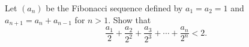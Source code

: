 Let $(a_n)$ be the Fibonacci sequence defined by $a_1 = a_2 = 1$ and $a_{n+1} = a_n + a_{n-1}$ for $n > 1$. Show that
\[
\frac{a_1}{2} + \frac{a_2}{2^2} + \frac{a_3}{2^3} + \cdots + \frac{a_n}{2^n} < 2.
\]
